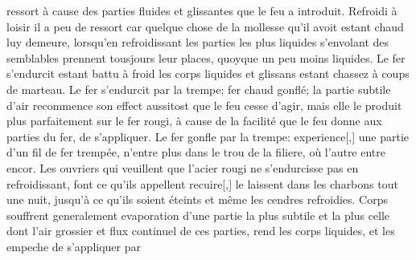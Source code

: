 %
ressort\protect{} \`{a} cause des parties fluides et glissantes que le feu\protect{} a introduit. Refroidi \`{a} loisir il a peu de ressort\protect{} car quelque chose de la mollesse qu'il avoit estant chaud luy demeure, lorsqu'en refroidissant les parties les plus liquides s'envolant des semblables prennent tousjours leur places, quoyque un peu moins liquides.
\pend%
\pstart%
Le fer\protect{} s'endurcit estant battu \`{a} froid les corps liquides et glissans estant chassez \`{a} coups de marteau\protect{}.\protect{}
\pend%
\pstart%
Le fer\protect{} s'endurcit par la trempe\protect{}; fer\protect{} chaud gonfl\'{e}; la partie subtile d'air recommence son effect aussitost que le feu\protect{} cesse d'agir, mais elle le produit plus parfaitement sur le fer\protect{} rougi, \`{a} cause de la facilit\'{e} que le feu\protect{} donne aux parties du fer\protect{}, de s'appliquer.
\pend%
\newpage%
\pstart%
Le fer\protect{} gonfle par la trempe\protect{}: experience\protect{}[,] une partie d'un fil de fer\protect{} tremp\'{e}e, n'entre plus dans le trou de la filiere\protect{}, o\`{u} l'autre entre encor.%
%
\pend %
\pstart%
Les
%
ouvriers qui veuillent que l'acier\protect{} rougi ne s'endurcisse pas en
refroidissant, font ce qu'ils appellent recuire[,] le laissent dans les charbons tout une nuit, jusqu'\`{a} ce qu'ils soient \'{e}teints et même les cendres refroidies.%
%
\pend%
\pstart%
Corps
%
souffrent generalement evaporation\protect{} d’une partie la plus subtile et la plus
 celle dont l’air grossier et
 flux continuel de ces parties, rend les corps liquides, et les empeche de s’appliquer par
